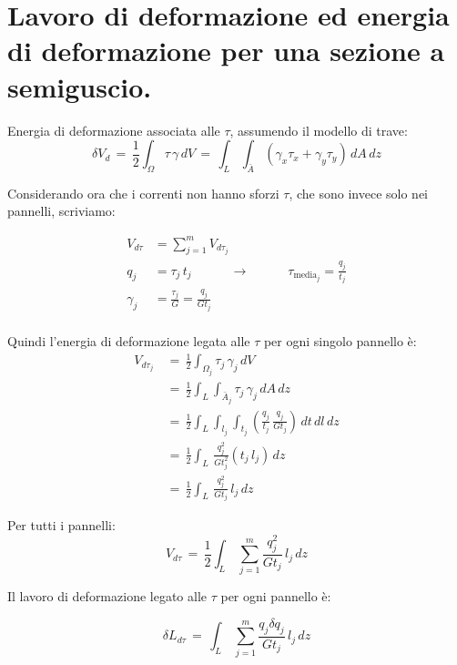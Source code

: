 \section{Lavoro di deformazione ed energia di deformazione per una sezione a semiguscio.}

Energia di deformazione associata alle $\tau$, assumendo il modello di trave:
\begin{equation*}
    \delta V_d \,=\, \frac{1}{2}\int_\Omega \tau\,\gamma \, dV \,=\, \int_L\int_{\bar{A}} (\gamma_x\tau_x+ \gamma_y\tau_y) \, dA\,dz
\end{equation*}

Considerando ora che i correnti non hanno sforzi $\tau$, che sono invece solo nei pannelli, scriviamo:

\begin{align*}
    V_{d\tau} &= \sum^m_{j=1} V_{d\tau_j} \\
    q_j&=\tau_j\,t_j    \quad \quad \quad\rightarrow \quad \quad \quad \tau_{\mathrm{media}_j}=\frac{q_j}{t_j}\\
    \gamma_j &=\frac{\tau_j}{G} = \frac{q_j}{Gt_j}\\
\end{align*}

Quindi l'energia di deformazione legata alle $\tau$ per ogni singolo pannello è:
\begin{align*}
    V_{d\tau_j} \,&=\, \frac{1}{2}\int_{\Omega_j} \tau_j\,\gamma_j \, dV \,\\
    &=\,\frac{1}{2} \int_L\int_{\bar{A}_j}\tau_j\,\gamma_j \, dA\,dz\\
     &=\,\frac{1}{2} \int_L\int_{l_j}\int_{t_j}  \left( \frac{q_j}{t_j} \,\frac{q_j}{Gt_j} \right)     \, dt\,dl\,dz\\
     &=\, \frac{1}{2} \int_L \,\frac{q_j^2}{Gt_j^2}\left( t_j\,l_j \right) \,dz\\
         &=\, \frac{1}{2} \int_L \,\frac{q_j^2}{Gt_j}\,l_j \,dz
\end{align*}

Per tutti i pannelli:
\begin{equation*}
     V_{d\tau} \,=\, \frac{1}{2} \int_L \,\sum^m_{j=1}\frac{q_j^2}{Gt_j}\,l_j \,dz
\end{equation*}

Il lavoro di deformazione legato alle $\tau$ per ogni pannello è:

\begin{equation*}
     \delta L_{d\tau} \,=\,  \int_L \,\sum^m_{j=1}\frac{q_j\delta q_j}{Gt_j}\,l_j \,dz
\end{equation*}

